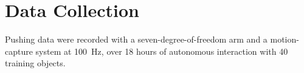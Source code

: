 \chapter{Data Collection}
\label{app:a}

Pushing data were recorded with a seven-degree-of-freedom arm and a motion-capture system at
100~Hz, over 18 hours of autonomous interaction with 40 training objects.
